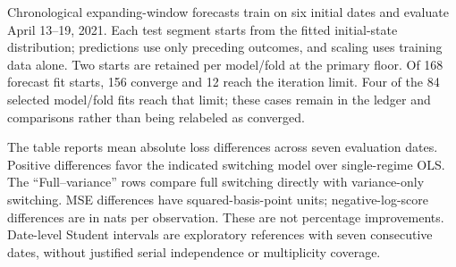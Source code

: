 Chronological expanding-window forecasts train on six initial dates and evaluate April 13--19, 2021. Each test segment starts from the fitted initial-state distribution; predictions use only preceding outcomes, and scaling uses training data alone. Two starts are retained per model/fold at the primary floor. Of 168 forecast fit starts, 156 converge and 12 reach the iteration limit. Four of the 84 selected model/fold fits reach that limit; these cases remain in the ledger and comparisons rather than being relabeled as converged.

The table reports mean absolute loss differences across seven evaluation dates. Positive differences favor the indicated switching model over single-regime OLS. The ``Full--variance'' rows compare full switching directly with variance-only switching. MSE differences have squared-basis-point units; negative-log-score differences are in nats per observation. These are not percentage improvements. Date-level Student intervals are exploratory references with seven consecutive dates, without justified serial independence or multiplicity coverage.

